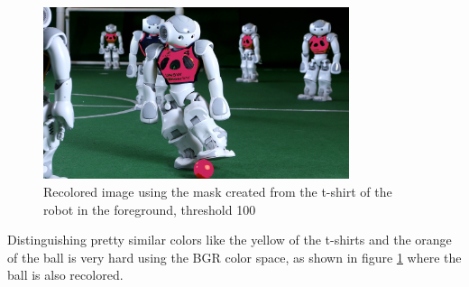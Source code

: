 \documentclass{article}
\begin{document}
\begin{figure}[H]
	\centering
	\includegraphics[width=0.8\textwidth]{robocup_recolorBGR100shirt.jpg}
	\caption{Recolored image using the mask created from the t-shirt of the robot in the foreground, threshold 100}
	\label{fig:recolorBGRbad}
\end{figure}

Distinguishing pretty similar colors like the yellow of the t-shirts and the orange of the ball is very hard using the BGR color space, as shown in figure \ref{fig:recolorBGRbad} where the ball is also recolored.
\end{document}
